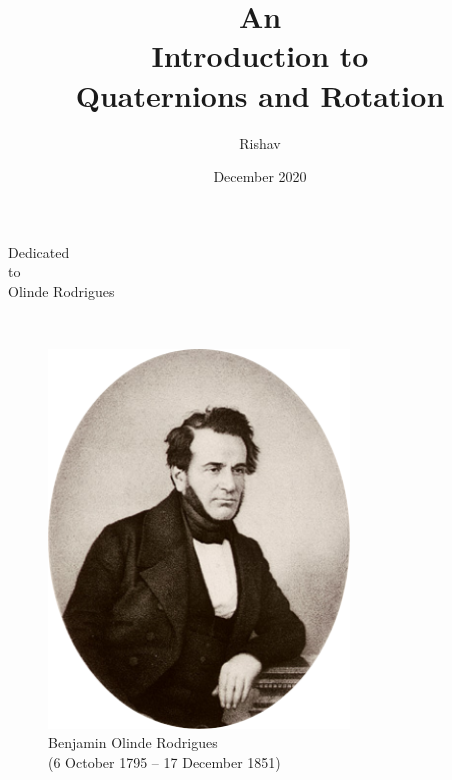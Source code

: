 \documentclass[12pt]{article}
\title{\color{my_color}An\\ Introduction to\\ Quaternions and Rotation}
\author{Rishav}
\date{December 2020}
\begin{document}
\newpage
\maketitle
\thispagestyle{empty}

\newpage
\thispagestyle{empty}
\begin{center}
    \Large{Dedicated \\ to \\ Olinde Rodrigues}
\end{center}
~\vfill
\begin{figure}[hbt!]
\begin{center}
\includegraphics[width = 8cm]{figs/fig_olinde_rodrigues.png}
\caption*{Benjamin Olinde Rodrigues\\ (6 October 1795 – 17 December 1851)}
\end{center}
\end{figure}
\vfill

\newpage
{}
\tableofcontents
\end{document}
